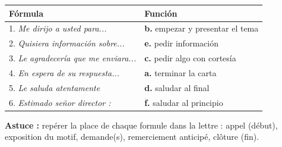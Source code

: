 \documentclass[11pt]{article}
\newcommand{\esp}[1]{\ifmmode\text{\textit{#1}}\else\begingroup\selectlanguage{spanish}\itshape #1\endgroup\fi}
\begin{document}
\begin{corrige}
\begin{center}
\begin{tabularx}{\linewidth}{|X|X|}
\hline
\rowcolor{popblueL} \textbf{Fórmula} & \textbf{Función} \\
\hline
1. \esp{Me dirijo a usted para...} & \textbf{b.} empezar y presentar el tema \\
\hline
2. \esp{Quisiera información sobre...} & \textbf{e.} pedir información \\
\hline
3. \esp{Le agradecería que me enviara...} & \textbf{c.} pedir algo con cortesía \\
\hline
4. \esp{En espera de su respuesta...} & \textbf{a.} terminar la carta \\
\hline
5. \esp{Le saluda atentamente} & \textbf{d.} saludar al final \\
\hline
6. \esp{Estimado señor director :} & \textbf{f.} saludar al principio \\
\hline
\end{tabularx}
\end{center}
\textbf{Astuce :} repérer la place de chaque formule dans la lettre : appel (début), exposition du motif, demande(s), remerciement anticipé, clôture (fin).
\end{corrige}
\end{document}
